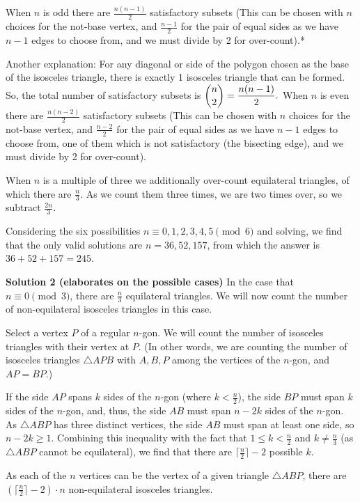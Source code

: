 \documentclass[a4paper,11pt]{article}
\begin{document}
When $n$ is odd there are $\frac{n(n-1)}{2}$ satisfactory subsets (This can be chosen with $n$ choices for the not-base vertex, and $\frac{n-1}{2}$ for the pair of equal sides as we have $n-1$ edges to choose from, and we must divide by 2 for over-count).*

Another explanation: For any diagonal or side of the polygon chosen as the base of the isosceles triangle, there is exactly 1 isosceles triangle that can be formed. So, the total number of satisfactory subsets is $\dbinom{n}{2}=\dfrac{n(n-1)}{2}.$
When $n$ is even there are $\frac{n(n-2)}{2}$ satisfactory subsets (This can be chosen with $n$ choices for the not-base vertex, and $\frac{n-2}{2}$ for the pair of equal sides as we have $n-1$ edges to choose from, one of them which is not satisfactory (the bisecting edge), and we must divide by 2 for over-count).

When $n$ is a multiple of three we additionally over-count equilateral triangles, of which there are $\frac{n}{3}$. As we count them three times, we are two times over, so we subtract $\frac{2n}{3}$.

Considering the six possibilities $n \equiv 0,1,2,3,4,5 \pmod{6}$ and solving, we find that the only valid solutions are $n = 36, 52, 157$, from which the answer is $36 + 52 + 157 = \boxed{245}$.

\textbf{Solution 2 (elaborates on the possible cases)}
In the case that $n\equiv 0\pmod 3$, there are $\frac{n}{3}$ equilateral triangles. We will now count the number of non-equilateral isosceles triangles in this case.

Select a vertex $P$ of a regular $n$-gon. We will count the number of isosceles triangles with their vertex at $P$. (In other words, we are counting the number of isosceles triangles $\triangle APB$ with $A, B, P$ among the vertices of the $n$-gon, and $AP=BP$.)

If the side $AP$ spans $k$ sides of the $n$-gon (where $k<\frac{n}{2}$), the side $BP$ must span $k$ sides of the $n$-gon, and, thus, the side $AB$ must span $n-2k$ sides of the $n$-gon. As $\triangle ABP$ has three distinct vertices, the side $AB$ must span at least one side, so $n-2k \ge 1$. Combining this inequality with the fact that $1\le k<\frac{n}{2}$ and $k\not = \frac{n}{3}$ (as $\triangle ABP$ cannot be equilateral), we find that there are $\lceil\frac{n}{2}\rceil-2$ possible $k$.

As each of the $n$ vertices can be the vertex of a given triangle $\triangle ABP$, there are $\left(\lceil \frac{n}{2} \rceil -2 \right)\cdot n$ non-equilateral isosceles triangles.
\end{document}
